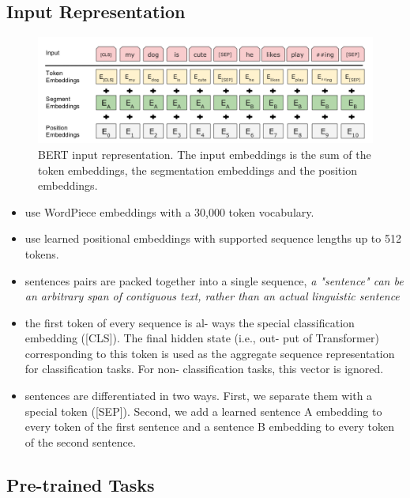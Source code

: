 \documentclass[a3paper, 12pt]{book} %
\begin{document}
\subsection{Input Representation}
\begin{figure}[htpb]
	\centering
	\includegraphics[width=\linewidth]{figures/bert_input_representation.png}
	\caption{BERT input representation. The input embeddings is the sum of the token embeddings, the segmentation embeddings and the position embeddings.}
	\label{fig:bert_input_representation}
\end{figure}
\begin{itemize}
	\item use WordPiece embeddings with a 30,000 token vocabulary.
	\item use learned positional embeddings with supported sequence lengths up to 512 tokens.
	\item sentences pairs are packed together into a single sequence, \emph{a "sentence" can be an arbitrary span of contiguous text, rather than an actual linguistic sentence}
	\item the first token of every sequence is al- ways the special classification embedding ([CLS]). The final hidden state (i.e., out- put of Transformer) corresponding to this token is used as the aggregate sequence representation for classification tasks. For non- classification tasks, this vector is ignored.
	\item sentences are differentiated in two ways. First, we separate them with a special token ([SEP]). Second, we add a learned sentence A embedding to every token of the first sentence and a sentence B embedding to every token of the second sentence.
\end{itemize}


\subsection{Pre-trained Tasks}
\end{document}
